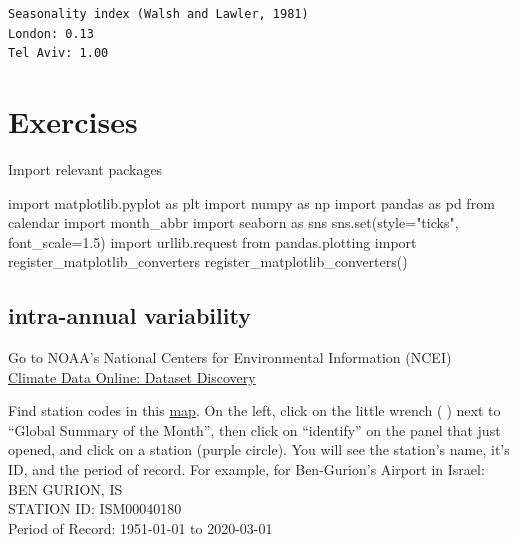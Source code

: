 \documentclass[
  letterpaper,
  DIV=11,
  numbers=noendperiod]{scrreprt}
\newenvironment{Shaded}{\begin{snugshade}}{\end{snugshade}}
\newcommand{\BuiltInTok}[1]{\textcolor[rgb]{0.00,0.23,0.31}{#1}}
\newcommand{\FloatTok}[1]{\textcolor[rgb]{0.68,0.00,0.00}{#1}}
\newcommand{\ImportTok}[1]{\textcolor[rgb]{0.00,0.46,0.62}{#1}}
\newcommand{\NormalTok}[1]{\textcolor[rgb]{0.00,0.23,0.31}{#1}}
\newcommand{\OperatorTok}[1]{\textcolor[rgb]{0.37,0.37,0.37}{#1}}
\newcommand{\StringTok}[1]{\textcolor[rgb]{0.13,0.47,0.30}{#1}}
\begin{document}
\begin{verbatim}
Seasonality index (Walsh and Lawler, 1981)
London: 0.13
Tel Aviv: 1.00
\end{verbatim}

\hypertarget{exercises-2}{%
\chapter{Exercises}\label{exercises-2}}

Import relevant packages

\begin{Shaded}
\begin{Highlighting}[]
\ImportTok{import}\NormalTok{ matplotlib.pyplot }\ImportTok{as}\NormalTok{ plt}
\ImportTok{import}\NormalTok{ numpy }\ImportTok{as}\NormalTok{ np}
\ImportTok{import}\NormalTok{ pandas }\ImportTok{as}\NormalTok{ pd}
\ImportTok{from}\NormalTok{ calendar }\ImportTok{import}\NormalTok{ month\_abbr}
\ImportTok{import}\NormalTok{ seaborn }\ImportTok{as}\NormalTok{ sns}
\NormalTok{sns.}\BuiltInTok{set}\NormalTok{(style}\OperatorTok{=}\StringTok{"ticks"}\NormalTok{, font\_scale}\OperatorTok{=}\FloatTok{1.5}\NormalTok{)}
\ImportTok{import}\NormalTok{ urllib.request}
\ImportTok{from}\NormalTok{ pandas.plotting }\ImportTok{import}\NormalTok{ register\_matplotlib\_converters}
\NormalTok{register\_matplotlib\_converters()}
\end{Highlighting}
\end{Shaded}

\hypertarget{intra-annual-variability}{%
\section{intra-annual variability}\label{intra-annual-variability}}

Go to NOAA's National Centers for Environmental Information (NCEI)\\
\href{https://www.ncdc.noaa.gov/cdo-web/datasets}{Climate Data Online:
Dataset Discovery}

Find station codes in this
\href{https://www.ncei.noaa.gov/maps/monthly/}{map}. On the left, click
on the little wrench (🔧) next to ``Global Summary of the Month'', then
click on ``identify'' on the panel that just opened, and click on a
station (purple circle). You will see the station's name, it's ID, and
the period of record. For example, for Ben-Gurion's Airport in Israel:\\
BEN GURION, IS\\
STATION ID: ISM00040180\\
Period of Record: 1951-01-01 to 2020-03-01
\end{document}
